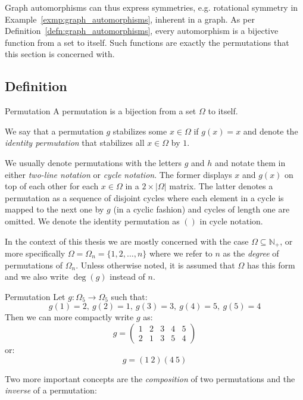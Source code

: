 %
Graph automorphisms can thus express symmetries, e.g. rotational symmetry in
Example~\ref{exmp:graph_automorphisms}, inherent in a graph. As per
Definition~\ref{defn:graph_automorphisms}, every automorphism is a bijective
function from a set to itself. Such functions are exactly the permutations that
this section is concerned with.

\subsection{Definition}
\label{subsec:perm_definition}

\begin{defn}{Permutation}
  A permutation is a bijection from a set $\Omega$ to itself.
\end{defn}
%
We say that a permutation $g$ stabilizes some $x \in \Omega$ if $g(x) = x$ and
denote the \textit{identity permutation} that stabilizes all $x \in \Omega$
by $1$.

We usually denote permutations with the letters $g$ and $h$ and notate them in
either \textit{two-line notation} or \textit{cycle notation}. The former
displays $x$ and $g(x)$ on top of each other for each $x \in \Omega$ in a $2
\times |\Omega|$ matrix. The latter denotes a permutation as a sequence of
disjoint cycles where each element in a cycle is mapped to the next one by $g$
(in a cyclic fashion) and cycles of length one are omitted. We denote the
identity permutation as $()$ in cycle notation.

In the context of this thesis we are mostly concerned with the case $\Omega
\subseteq \mathbb{N}_+$, or more specifically $\Omega = \Omega_n = \{1, 2,
\dots, n\}$ where we refer to $n$ as the \textit{degree} of permutations of
$\Omega_n$. Unless otherwise noted, it is assumed that $\Omega$ has this form
and we also write $\operatorname{deg}(g)$ instead of $n$.

\begin{exmp}[label=exmp:permutation]{Permutation}
  Let $g: \Omega_5 \rightarrow \Omega_5$ such that:
  \begin{equation*}
    g(1) = 2,\ g(2) = 1,\ g(3) = 3,\ g(4) = 5,\ g(5) = 4
  \end{equation*}
  Then we can more compactly write $g$ as:
  \begin{equation*}
    g = \begin{pmatrix} 1 & 2 & 3 & 4 & 5 \\ 2 & 1 & 3 & 5 & 4 \end{pmatrix}
  \end{equation*}
  or:
  \begin{equation*}
    g = (1\ 2)(4\ 5)
  \end{equation*}
\end{exmp}
%
Two more important concepts are the \textit{composition} of two permutations
and the \textit{inverse} of a permutation:

